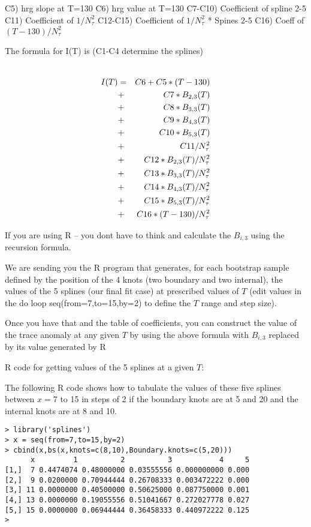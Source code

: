 \documentclass{article}
\begin{document}
C5) hrg slope at T=130
C6) hrg value at T=130
C7-C10) Coefficient of spline 2-5
C11) Coefficient of $1/N_\tau^2$
C12-C15) Coefficient of $1/N_\tau^2$ * Spines 2-5
C16) Coeff of $(T-130)/N_\tau^2$

The formula for I(T) is (C1-C4 determine the splines)

\begin{eqnarray}
\cr I(T) &=& C6 + C5 * (T-130) \\ \nonumber
       &+& C7 * B_{2,3}(T) \\ \nonumber
       &+& C8 * B_{3,3}(T) \\ \nonumber
       &+& C9 * B_{4,3}(T) \\ \nonumber 
       &+& C10 * B_{5,3}(T) \\ \nonumber
       &+& C11 / N_\tau^2 \\ \nonumber
       &+& C12* B_{2,3}(T) / N_\tau^2 \\ \nonumber
       &+& C13* B_{3,3}(T) / N_\tau^2 \\ \nonumber
       &+& C14* B_{4,3}(T) / N_\tau^2 \\ \nonumber
       &+& C15* B_{5,3}(T) / N_\tau^2 \\ \nonumber
       &+& C16* (T-130)    / N_\tau^2 \nonumber
\end{eqnarray}

If you are using R -- you dont have to think and calculate the $B_{i,3}$ 
using the recursion formula. 

We are sending you the R program that generates, for each bootstrap
sample defined by the position of the 4 knots (two boundary and two
internal), the values of the 5 splines (our final fit case) at
prescribed values of $T$ (edit values in the do loop
seq(from=7,to=15,by=2) to define the $T$ range and step size).

Once you have that and the table of coefficients, you can 
construct the value of the trace anomaly at any given $T$ by 
using the above formula with $B_{i,3}$ replaced by its value 
generated by R


R code for getting values of the 5 splines at a given $T$:

The following R code shows how to
tabulate the values of these five splines between \(x=7\) to 15 in steps of
2 if the boundary knots are at 5 and 20 and the internal knots are at
8 and 10.
\begin{verbatim}
> library('splines')
> x = seq(from=7,to=15,by=2)
> cbind(x,bs(x,knots=c(8,10),Boundary.knots=c(5,20)))
      x         1          2          3           4     5
[1,]  7 0.4474074 0.48000000 0.03555556 0.000000000 0.000
[2,]  9 0.0200000 0.70944444 0.26708333 0.003472222 0.000
[3,] 11 0.0000000 0.40500000 0.50625000 0.087750000 0.001
[4,] 13 0.0000000 0.19055556 0.51041667 0.272027778 0.027
[5,] 15 0.0000000 0.06944444 0.36458333 0.440972222 0.125
> 
\end{verbatim}
\end{document}
